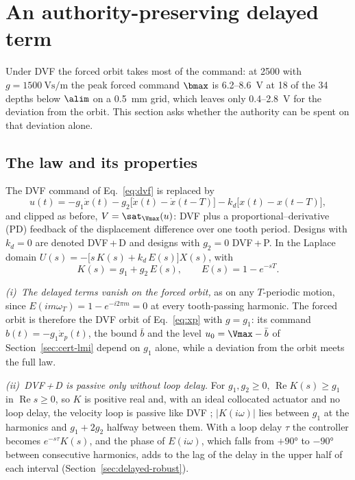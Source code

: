 \section{An authority-preserving delayed term}\label{sec:delayed}

Under DVF the forced orbit takes most of the command: at \SI{2500}{\rpm} with $g=\SI{1500}{\volt\second\per\metre}$ the peak forced command $\bmax$ is 6.2--\SI{8.6}{\volt} at 18 of the 34 depths below $\alim$ on a \SI{0.5}{\milli\metre} grid, which leaves only 0.4--\SI{2.8}{\volt} for the deviation from the orbit. This section asks whether the authority can be spent on that deviation alone.

\subsection{The law and its properties}\label{sec:delayed-law}

The DVF command of Eq.~\eqref{eq:dvf} is replaced by
\begin{equation}\label{eq:comb-law}
  u(t)=-g_1\dot x(t)-g_2\bigl[\dot x(t)-\dot x(t-T)\bigr]-k_d\bigl[x(t)-x(t-T)\bigr],
\end{equation}
and clipped as before, $V=\sat_{\Vmax}(u)$: DVF plus a proportional--derivative (PD) feedback of the displacement difference over one tooth period. Designs with $k_d=0$ are denoted DVF\,+\,D and designs with $g_2=0$ DVF\,+\,P. In the Laplace domain $U(s)=-\bigl[s\,K(s)+k_d\,E(s)\bigr]X(s)$, with
\begin{equation}\label{eq:comb-K}
  K(s)=g_1+g_2\,E(s),\qquad E(s)=1-e^{-sT}.
\end{equation}

\emph{(i)~The delayed terms vanish on the forced orbit,} as on any $T$-periodic motion, since $E(im\omega_T)=1-e^{-i2\pi m}=0$ at every tooth-passing harmonic. The forced orbit is therefore the DVF orbit of Eq.~\eqref{eq:xp} with $g=g_1$: its command $b(t)=-g_1\dot x_p(t)$, the bound $\bar b$ and the level $u_0=\Vmax-\bar b$ of Section~\ref{sec:cert-lmi} depend on $g_1$ alone, while a deviation from the orbit meets the full law.

\emph{(ii)~DVF\,+\,D is passive only without loop delay.} For $g_1,g_2\ge0$, $\operatorname{Re}K(s)\ge g_1$ in $\operatorname{Re}s\ge0$, so $K$ is positive real and, with an ideal collocated actuator and no loop delay, the velocity loop is passive like DVF \citep{elliott2001feedback}; $\lvert K(i\omega)\rvert$ lies between $g_1$ at the harmonics and $g_1+2g_2$ halfway between them. With a loop delay $\tau$ the controller becomes $e^{-s\tau}K(s)$, and the phase of $E(i\omega)$, which falls from $+\ang{90}$ to $-\ang{90}$ between consecutive harmonics, adds to the lag of the delay in the upper half of each interval (Section~\ref{sec:delayed-robust}).


